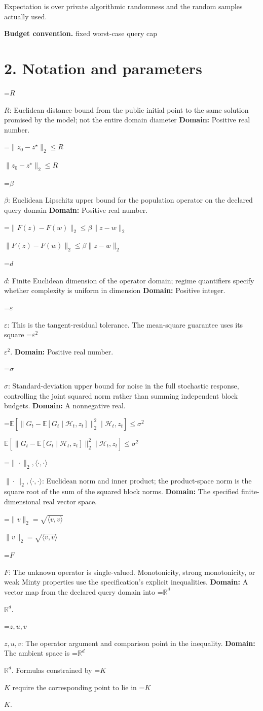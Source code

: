 \documentclass[10pt,a4paper]{article}
\newcommand{\AtlasMath}[1]{\par\begingroup\centering\setbox0=\hbox{$\displaystyle #1$}\ifdim\wd0>1.4\linewidth\typeout{ATLAS WIDE FORMULA: \the\wd0}\fi\ifdim\wd0>\linewidth\resizebox{\linewidth}{!}{\box0}\else\box0\fi\par\endgroup}
\newcommand{\AtlasInlineMath}[1]{\begingroup\setbox0=\hbox{$#1$}\ifdim\wd0>.4\linewidth\endgroup\AtlasMath{#1}\else\endgroup$#1$\fi}
\begin{document}
Expectation is over private algorithmic randomness and the random samples actually used.

\textbf{Budget convention.} fixed worst-case query cap

\section{2. Notation and parameters}
\AtlasInlineMath{R}: Euclidean distance bound from the public initial point to the same solution promised by the model; not the entire domain diameter \textbf{Domain:} Positive real number.

\AtlasInlineMath{\|z_0-z^\star\|_2\le R}

\AtlasInlineMath{\beta}: Euclidean Lipschitz upper bound for the population operator on the declared query domain \textbf{Domain:} Positive real number.

\AtlasInlineMath{\|F(z)-F(w)\|_2\le\beta\|z-w\|_2}

\AtlasInlineMath{d}: Finite Euclidean dimension of the operator domain; regime quantifiers specify whether complexity is uniform in dimension \textbf{Domain:} Positive integer.

\AtlasInlineMath{\varepsilon}: This is the tangent-residual tolerance. The mean-square guarantee uses its square \AtlasInlineMath{\varepsilon^2}. \textbf{Domain:} Positive real number.

\AtlasInlineMath{\sigma}: Standard-deviation upper bound for noise in the full stochastic response, controlling the joint squared norm rather than summing independent block budgets. \textbf{Domain:} A nonnegative real.

\AtlasInlineMath{\mathbb E[\|G_t-\mathbb E[G_t\mid\mathcal H_t,z_t]\|_2^2\mid\mathcal H_t,z_t]\le\sigma^2}

\AtlasInlineMath{\|\cdot\|_2,\langle\cdot,\cdot\rangle}: Euclidean norm and inner product; the product-space norm is the square root of the sum of the squared block norms. \textbf{Domain:} The specified finite-dimensional real vector space.

\AtlasInlineMath{\|v\|_2=\sqrt{\langle v,v\rangle}}

\AtlasInlineMath{F}: The unknown operator is single-valued. Monotonicity, strong monotonicity, or weak Minty properties use the specification’s explicit inequalities. \textbf{Domain:} A vector map from the declared query domain into \AtlasInlineMath{\mathbb R^d}.

\AtlasInlineMath{z,u,v}: The operator argument and comparison point in the inequality. \textbf{Domain:} The ambient space is \AtlasInlineMath{\mathbb R^d}. Formulas constrained by \AtlasInlineMath{K} require the corresponding point to lie in \AtlasInlineMath{K}.
\end{document}
